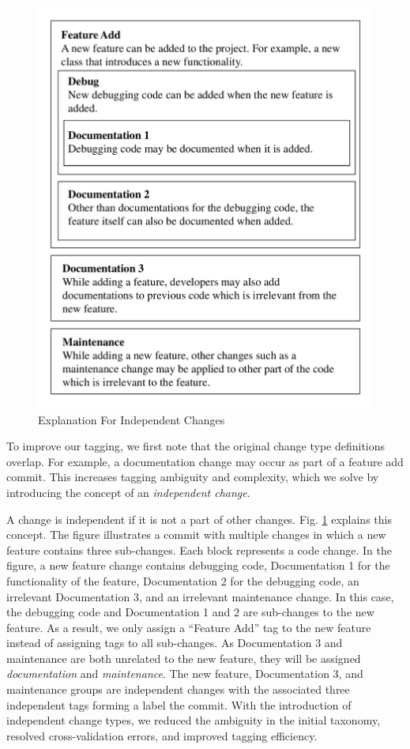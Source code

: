 \begin{figure}[htbp]
\centerline{\includegraphics[scale=0.5]{figures/independent_change.pdf}}
\caption{Explanation For Independent Changes}
\label{fig:Relationship}
\end{figure}

To improve our tagging, we first note that the original change type definitions overlap. For example, a documentation change may occur as part of a feature add commit. This increases tagging ambiguity and complexity, which we solve by introducing the concept of an \textit{independent change}.

A change is independent if it is not a part of other changes.
Fig. \ref{fig:Relationship} explains this concept. The figure illustrates a commit with multiple changes in which a new feature contains three sub-changes.
Each block represents a code change. 
In the figure, a new feature change contains debugging code, Documentation 1 for the functionality of the feature, Documentation 2 for the debugging code, an irrelevant Documentation 3, and an irrelevant maintenance change. 
In this case, the debugging code and Documentation 1 and 2 are sub-changes to the new feature. 
As a result, we only assign a ``Feature Add'' tag to the new feature instead of assigning tags to all sub-changes. 
As Documentation 3 and maintenance are both unrelated to the new feature, they will be assigned \textit{documentation} and \textit{maintenance}.
The new feature, Documentation 3, and maintenance groups are independent changes with the associated three independent tags forming a label the commit. 
With the introduction of independent change types, we reduced the ambiguity in the initial taxonomy, resolved cross-validation errors, and improved tagging efficiency.

